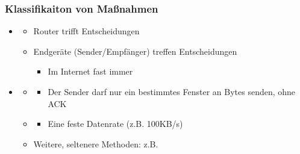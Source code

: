 \subsubsection*{Klassifikaiton von Maßnahmen}
\begin{itemize}
    \item {}
    \begin{itemize}
        \item {} Router trifft Entscheidungen
        \item {} Endgeräte (Sender/Empfänger) treffen Entscheidungen
        \begin{itemize}
            \item Im Internet fast immer 
        \end{itemize}
    \end{itemize}
    \item {}
    \begin{itemize}
        \item {}
        \begin{itemize}
            \item Der Sender darf nur ein bestimmtes Fenster an Bytes senden, ohne ACK
        \end{itemize}
        \item {}
        \begin{itemize}
            \item Eine feste Datenrate (z.B. 100KB/s)
        \end{itemize}
        \item Weitere, seltenere Methoden: z.B. 
    \end{itemize}
\end{itemize}
